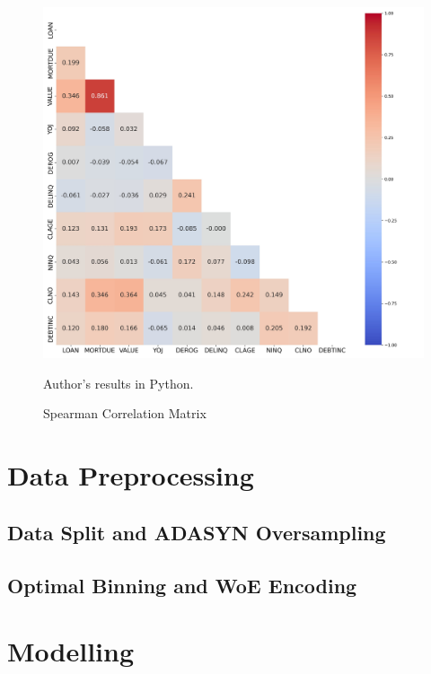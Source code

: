     \begin{figure}[H]
        \begin{center}
        \caption{Spearman Correlation Matrix}
        \label{fig:spearmancorr}
        \includegraphics[width=150mm]{Figures/Spearman_Correlation_Matrix_Continuous_Features.jpg}
    \end{center}
    \begin{center}
        \begin{source}Author's results in Python.\end{source}
        \end{center}
    \end{figure}

\section{Data Preprocessing}
\subsection{Data Split and ADASYN Oversampling}
\label{subsec:data-split-ADASYN}
\subsection{Optimal Binning and WoE Encoding}
\label{subsec:prep-optbinning}
\section{Modelling}
